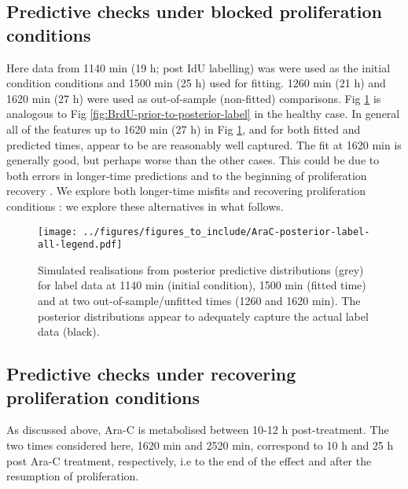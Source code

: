 \documentclass[10pt,letterpaper]{article}
\providecommand{\DIFaddtex}[1]{{\protect\color{blue} \sf #1}} %
\providecommand{\DIFdeltex}[1]{{\protect\color{red} \scriptsize #1}} %
\providecommand{\DIFaddbegin}{} %
\providecommand{\DIFaddend}{} %
\providecommand{\DIFdelbegin}{} %
\providecommand{\DIFdelend}{} %
\providecommand{\DIFadd}[1]{\texorpdfstring{\DIFaddtex{#1}}{#1}} %
\providecommand{\DIFdel}[1]{\texorpdfstring{\DIFdeltex{#1}}{}} %
\begin{document}
\subsection{Predictive checks under blocked proliferation
conditions}\label{predictive-checks-under-blocked-proliferation-conditions}

Here \DIFaddbegin \DIFadd{data from }\DIFaddend 1140 min (19 h; post IdU labelling) \DIFdelbegin \DIFdel{was }\DIFdelend \DIFaddbegin \DIFadd{were }\DIFaddend used as the
initial \DIFdelbegin \DIFdel{condition }\DIFdelend \DIFaddbegin \DIFadd{conditions }\DIFaddend and 1500 min (25 h) used for fitting. 1260 min (21 h)
and 1620 min (27 h) were used as out-of-sample (non-fitted) comparisons.
Fig \ref{fig:AraC-posterior-label-all} is analogous to Fig
\ref{fig:BrdU-prior-to-posterior-label} in the healthy case. In general
all of the features up to 1620 min (27 h) in Fig
\ref{fig:AraC-posterior-label-all}, and for both fitted and predicted
times, \DIFdelbegin \DIFdel{appear to be }\DIFdelend \DIFaddbegin \DIFadd{are }\DIFaddend reasonably well captured. The fit at 1620 min is generally
good, but perhaps worse than the other cases. This could be due to
\DIFdelbegin \DIFdel{both }\DIFdelend errors in longer-time predictions and to the beginning of proliferation
recovery\DIFdelbegin \DIFdel{. We explore both longer-time misfits and
recovering proliferation conditions }\DIFdelend \DIFaddbegin \DIFadd{: we explore these alternatives }\DIFaddend in what follows.

\begin{figure}
\centering
\texttt{[image: ../figures/figures\_to\_include/AraC-posterior-label-all-legend.pdf]}
\caption{Simulated realisations from posterior predictive distributions
(grey) for label data at 1140 min (initial condition), 1500 min (fitted
time) and at two out-of-sample/unfitted times (1260 and 1620 min). The
posterior distributions appear to adequately capture the actual label
data (black).\label{fig:AraC-posterior-label-all}}
\end{figure}

\subsection{Predictive checks under recovering proliferation
conditions}\label{predictive-checks-under-recovering-proliferation-conditions}

As discussed above, Ara-C is metabolised between 10-12 h post-treatment.
The two times considered here, 1620 min and 2520 min, correspond to 10 h
and 25 h post Ara-C treatment, respectively, i.e to the end of the
effect and after the resumption of proliferation.
\end{document}
